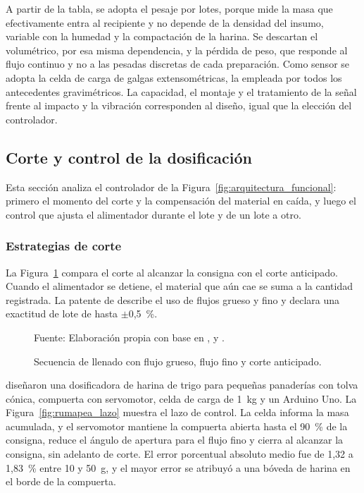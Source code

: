 A partir de la tabla, se adopta el pesaje por lotes, porque mide la masa que
efectivamente entra al recipiente y no depende de la densidad del insumo,
variable con la humedad y la compactación de la harina. Se descartan el
volumétrico, por esa misma dependencia, y la pérdida de peso, que responde al
flujo continuo y no a las pesadas discretas de cada preparación. Como sensor se
adopta la celda de carga de galgas extensométricas, la empleada por todos los
antecedentes gravimétricos. La capacidad, el montaje y el tratamiento de la
señal frente al impacto y la vibración corresponden al diseño, igual que la
elección del controlador.

\subsection{Corte y control de la dosificación}
\label{sec:teoria_control}

Esta sección analiza el controlador de la
Figura~\ref{fig:arquitectura_funcional}: primero el momento del corte y la
compensación del material en caída, y luego el control que ajusta el
alimentador durante el lote y de un lote a otro.

\subsubsection{Estrategias de corte}
\label{subsec:control_corte}

La Figura~\ref{fig:secuencia_llenado} compara el corte al alcanzar la
consigna con el corte anticipado. Cuando el alimentador se detiene, el
material que aún cae se suma a la cantidad registrada. La patente de
\textcite{buhler2022dosing} describe el uso de flujos grueso y fino y declara
una exactitud de lote de hasta $\pm$0,5~\%.

\begin{figure}[H]
    \centering
    \resizebox{0.7\textwidth}{!}{}
    \caption{Secuencia de llenado con flujo grueso, flujo fino y corte anticipado.}
    \label{fig:secuencia_llenado}
    \vspace{0.2em}
    {\footnotesize Fuente: Elaboración propia con base en
    \textcite{hidalgo2020llenado}, \textcite{hadi2025weighing} y
    \textcite{bulatov2021dosing}.}
\end{figure}

\textcite{rumapea2026flour} diseñaron una dosificadora de harina de trigo para
pequeñas panaderías con tolva cónica, compuerta con servomotor, celda de carga
de 1~kg y un Arduino Uno. La Figura~\ref{fig:rumapea_lazo} muestra el lazo de
control. La celda informa la masa acumulada, y el servomotor mantiene la
compuerta abierta hasta el 90~\% de la consigna, reduce el ángulo de apertura
para el flujo fino y cierra al alcanzar la consigna, sin adelanto de corte. El
error porcentual absoluto medio fue de 1,32 a 1,83~\% entre 10 y 50~g, y el
mayor error se atribuyó a una bóveda de harina en el borde de la compuerta.

